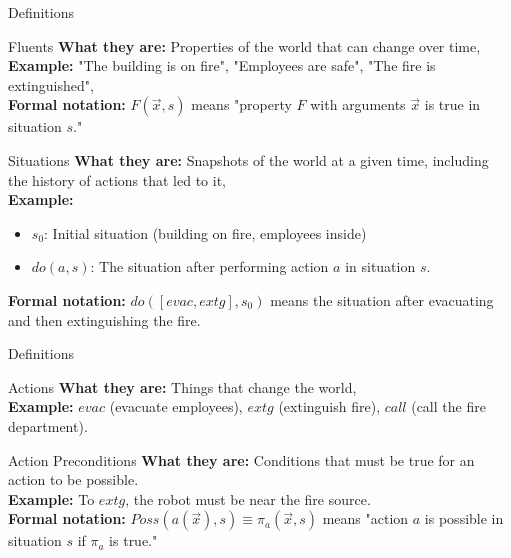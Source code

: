 \documentclass[compress,xcolor=table]{beamer}
\begin{document}
\begin{frame}{Definitions}
    \begin{block}{Fluents}
        \textbf{What they are:} Properties of the world that can change over time, \\
        \textbf{Example:} "The building is on fire", "Employees are safe", "The fire is extinguished", \\
        \textbf{Formal notation:} $F(\vec{x},s)$ means "property $F$ with arguments $\vec{x}$ is true in situation $s$." 
    \end{block}
    \pause
    \begin{block}{Situations}
        \textbf{What they are:} Snapshots of the world at a given time, including the history of actions that led to it, \\
        
        \textbf{Example:} 
        \begin{itemize}
            \item $s_0$: Initial situation (building on fire, employees inside)
            \item $do(a,s)$: The situation after performing action $a$ in situation $s$.
        \end{itemize}

        \textbf{Formal notation:} $do([evac,extg],s_0)$ means the situation after evacuating and then extinguishing the fire.
    \end{block}
\end{frame}

\begin{frame}{Definitions}
    \begin{block}{Actions}
        \textbf{What they are:} Things that change the world, \\
        \textbf{Example:} $evac$ (evacuate employees), $extg$ (extinguish fire), $call$ (call the fire department).
    \end{block}
    \pause
    \begin{block}{Action Preconditions}
        \textbf{What they are:} Conditions that must be true for an action to be possible.\\
        \textbf{Example:} To $extg$, the robot must be near the fire source.\\
        \textbf{Formal notation:} $Poss(a(\vec{x}),s) \equiv \pi_a(\vec{x}, s)$ means "action $a$ is possible in situation $s$ if $\pi_a$ is true."
    \end{block}
\end{frame}
\end{document}
